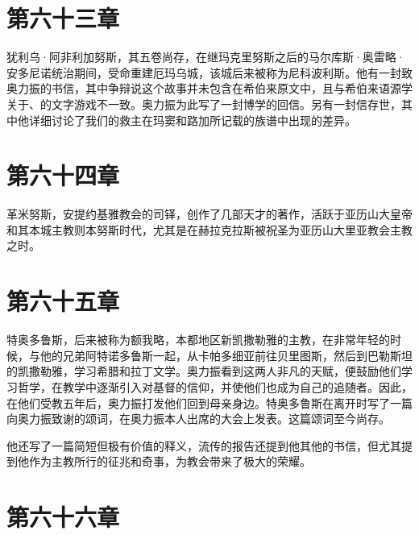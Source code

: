 \section{第六十三章}

犹利乌·阿非利加努斯，其五卷尚存，在继玛克里努斯之后的马尔库斯·奥雷略·安多尼诺统治期间，受命重建厄玛乌城，该城后来被称为尼科波利斯。他有一封致奥力振的书信，其中争辩说这个故事并未包含在希伯来原文中，且与希伯来语源学关于、的文字游戏不一致。奥力振为此写了一封博学的回信。另有一封信存世，其中他详细讨论了我们的救主在玛窦和路加所记载的族谱中出现的差异。\par


\section{第六十四章}

革米努斯，安提约基雅教会的司铎，创作了几部天才的著作，活跃于亚历山大皇帝和其本城主教则本努斯时代，尤其是在赫拉克拉斯被祝圣为亚历山大里亚教会主教之时。\par


\section{第六十五章}

特奥多鲁斯，后来被称为额我略，本都地区新凯撒勒雅的主教，在非常年轻的时候，与他的兄弟阿特诺多鲁斯一起，从卡帕多细亚前往贝里图斯，然后到巴勒斯坦的凯撒勒雅，学习希腊和拉丁文学。奥力振看到这两人非凡的天赋，便鼓励他们学习哲学，在教学中逐渐引入对基督的信仰，并使他们也成为自己的追随者。因此，在他们受教五年后，奥力振打发他们回到母亲身边。特奥多鲁斯在离开时写了一篇向奥力振致谢的颂词，在奥力振本人出席的大会上发表。这篇颂词至今尚存。\par

他还写了一篇简短但极有价值的释义，流传的报告还提到他其他的书信，但尤其提到他作为主教所行的征兆和奇事，为教会带来了极大的荣耀。\par


\section{第六十六章}

